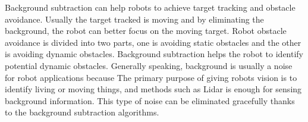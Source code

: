 Background subtraction can help robots to achieve target tracking and obstacle avoidance. Usually the target tracked is moving and by eliminating the background, the robot can better focus on the moving target. Robot obstacle avoidance is divided into two parts, one is avoiding static obstacles and the other is avoiding dynamic obstacles. Background subtraction helps the robot to identify potential dynamic obstacles. Generally speaking, background is usually a noise for robot applications because The primary purpose of giving robots vision is to identify living or moving things, and methods such as Lidar is enough for sensing background information. This type of noise can be eliminated gracefully thanks to the background subtraction algorithms.
